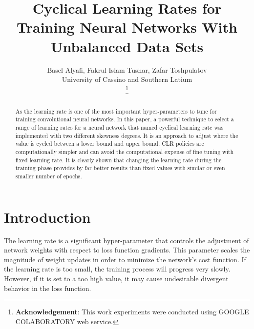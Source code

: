 \documentclass[journal, a4paper]{IEEEtran}
\begin{document}
	\title{Cyclical Learning Rates for Training Neural Networks With Unbalanced Data Sets}
	\author{Basel Alyafi, Fakrul Islam Tushar, Zafar Toshpulatov
	
	University of Cassino and Southern Latium
	
	\thanks{\textbf{Acknowledgement}: This work experiments were conducted using GOOGLE COLABORATORY web service.}}
	\maketitle

\begin{abstract}
As the learning rate is one of the most important hyper-parameters to tune for training convolutional neural networks. In this paper, a powerful technique to select a range of learning rates for a neural network that named cyclical learning rate was implemented with two different skewness degrees. It is an approach to adjust where the value is cycled between a lower bound and upper bound. CLR policies are computationally simpler and can avoid the computational expense of fine tuning with fixed learning rate. It is clearly shown that changing the learning rate during the training phase provides by far better results than fixed values with similar or even smaller number of epochs.
\end{abstract}
\section{Introduction}
	The learning rate is a significant hyper-parameter that controls the adjustment of network weights with respect to loss function gradients. This parameter scales the magnitude of weight updates in order to minimize the network's cost function. If the learning rate is too small, the training process will progress very slowly. However, if it is set to a too high value, it may cause undesirable divergent behavior in the loss function.
	
\end{document}
